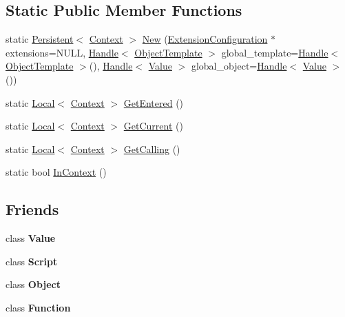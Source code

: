 \subsection*{Static Public Member Functions}
\begin{DoxyCompactItemize}
\item 
static \hyperlink{classv8_1_1_persistent}{Persistent}$<$ \hyperlink{classv8_1_1_context}{Context} $>$ \hyperlink{classv8_1_1_context_add11dd18ee8e7f03d383afa79e87d1e6}{New} (\hyperlink{classv8_1_1_extension_configuration}{Extension\+Configuration} $\ast$extensions=N\+U\+L\+L, \hyperlink{classv8_1_1_handle}{Handle}$<$ \hyperlink{classv8_1_1_object_template}{Object\+Template} $>$ global\+\_\+template=\hyperlink{classv8_1_1_handle}{Handle}$<$ \hyperlink{classv8_1_1_object_template}{Object\+Template} $>$(), \hyperlink{classv8_1_1_handle}{Handle}$<$ \hyperlink{classv8_1_1_value}{Value} $>$ global\+\_\+object=\hyperlink{classv8_1_1_handle}{Handle}$<$ \hyperlink{classv8_1_1_value}{Value} $>$())
\item 
static \hyperlink{classv8_1_1_local}{Local}$<$ \hyperlink{classv8_1_1_context}{Context} $>$ \hyperlink{classv8_1_1_context_accfc7365efba8bce18cbf9df1c1fc79d}{Get\+Entered} ()
\item 
static \hyperlink{classv8_1_1_local}{Local}$<$ \hyperlink{classv8_1_1_context}{Context} $>$ \hyperlink{classv8_1_1_context_aca2df9d70e51f241d733f4ad0eb46401}{Get\+Current} ()
\item 
static \hyperlink{classv8_1_1_local}{Local}$<$ \hyperlink{classv8_1_1_context}{Context} $>$ \hyperlink{classv8_1_1_context_ad795cbbb842307a57d656dd9690fadf2}{Get\+Calling} ()
\item 
static bool \hyperlink{classv8_1_1_context_a5cf983417f9cfc6e1dd9228eccb78d31}{In\+Context} ()
\end{DoxyCompactItemize}
\subsection*{Friends}
\begin{DoxyCompactItemize}
\item 
\hypertarget{classv8_1_1_context_aeceedf6e1a7d48a588516ce2b1983d6f}{}class {\bfseries Value}\label{classv8_1_1_context_aeceedf6e1a7d48a588516ce2b1983d6f}

\item 
\hypertarget{classv8_1_1_context_ae98eaa96d1b24e087f3c3e372fb09dce}{}class {\bfseries Script}\label{classv8_1_1_context_ae98eaa96d1b24e087f3c3e372fb09dce}

\item 
\hypertarget{classv8_1_1_context_a0720b5f434e636e22a3ed34f847eec57}{}class {\bfseries Object}\label{classv8_1_1_context_a0720b5f434e636e22a3ed34f847eec57}

\item 
\hypertarget{classv8_1_1_context_ab7194606aa12931e96f8f5448d418ed0}{}class {\bfseries Function}\label{classv8_1_1_context_ab7194606aa12931e96f8f5448d418ed0}

\end{DoxyCompactItemize}


